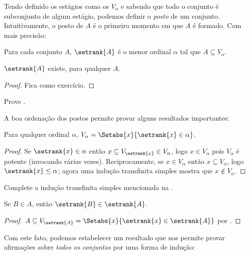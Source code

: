 \documentclass[../../../include/open-logic-section]{subfiles}
\begin{document}

Tendo definido os estágios como os $V_\alpha$ e sabendo
que todo o conjunto é subconjunto de algum estágio, podemos definir o
\emph{posto} de um conjunto. Intuitivamente, o posto de $A$ é o primeiro momento
em que $A$ é formado. Com mais precisão:

\begin{defn}
Para cada conjunto $A$, $\setrank{A}$ é o menor ordinal $\alpha$ tal que $A
\subseteq V_\alpha$.
\end{defn}
\begin{prop}
	$\setrank{A}$ existe, para qualquer $A$.
\end{prop}
\begin{proof}
	Fica como exercício.
\end{proof}
\begin{prob}
	Prove .	
\end{prob}
\noindent 
A boa ordenação dos postos permite provar alguns resultados importantes:
\begin{prop}
Para qualquer ordinal $\alpha$, $V_\alpha = \Setabs{x}{\setrank{x} \in \alpha}$.
\end{prop}

\begin{proof}
Se $\setrank{x} \in \alpha$ então $x \subseteq V_{\setrank{x}} \in
V_\alpha$, logo $x \in V_\alpha$ pois $V_\alpha$ é potente (invocando
 várias vezes). Reciprocamente, se $x \in V_\alpha$ então $x \subseteq V_\alpha$, logo $\setrank{x} \leq \alpha$; agora uma indução transfinita simples mostra que $x \notin V_\alpha$. 
\end{proof}
\begin{prob}
	Complete a indução transfinita simples mencionada na .
\end{prob}

\begin{prop}
Se $B \in A$, então $\setrank{B} \in \setrank{A}$.
\end{prop}

\begin{proof}
$A \subseteq V_{\setrank{A}} = \Setabs{x}{\setrank{x} \in
\setrank{A}}$ por .
\end{proof}
\noindent
Com este fato, podemos estabelecer um resultado que nos permite provar
afirmações sobre \emph{todos os conjuntos} por uma forma de indução:
\end{document}
